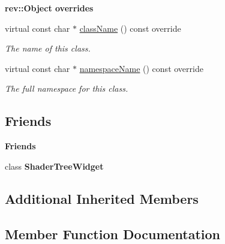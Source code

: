 \begin{Indent}\textbf{ rev\+::Object overrides}\par
\begin{DoxyCompactItemize}
\item 
virtual const char $\ast$ \mbox{\hyperlink{classrev_1_1_view_1_1_shader_tree_item_aa343381f05afa92936c6ffbbe106b2b6}{class\+Name}} () const override
\begin{DoxyCompactList}\small\item\em The name of this class. \end{DoxyCompactList}\item 
virtual const char $\ast$ \mbox{\hyperlink{classrev_1_1_view_1_1_shader_tree_item_a684fab698c34ef0456cb86ec590b6385}{namespace\+Name}} () const override
\begin{DoxyCompactList}\small\item\em The full namespace for this class. \end{DoxyCompactList}\end{DoxyCompactItemize}
\end{Indent}
\subsection*{Friends}
\begin{Indent}\textbf{ Friends}\par
\begin{DoxyCompactItemize}
\item 
\mbox{\label{classrev_1_1_view_1_1_shader_tree_item_aca44ab1adacfadfb2725f0db9f6bd6af}} 
class {\bfseries Shader\+Tree\+Widget}
\end{DoxyCompactItemize}
\end{Indent}
\subsection*{Additional Inherited Members}


\subsection{Member Function Documentation}
\mbox{\label{classrev_1_1_view_1_1_shader_tree_item_aa343381f05afa92936c6ffbbe106b2b6}} 

